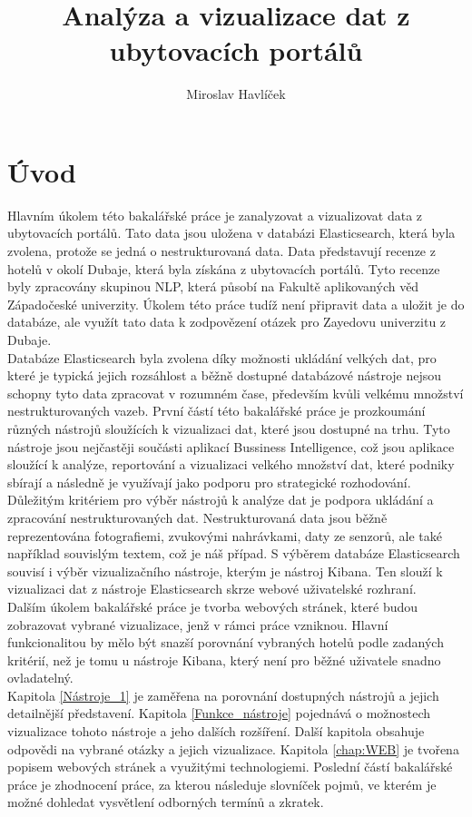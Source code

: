 \documentclass[czech,BP]{thesiskiv}
\author{Miroslav Havlíček}
\title{Analýza a vizualizace dat z ubytovacích portálů}
\begin{document}
%
\maketitle
\tableofcontents
\chapter{Úvod}
Hlavním úkolem této bakalářské práce je zanalyzovat a vizualizovat data z ubytovacích portálů. Tato data jsou uložena v databázi Elasticsearch, která byla zvolena, protože se jedná o nestrukturovaná data. Data představují recenze z hotelů v okolí Dubaje, která byla získána z ubytovacích portálů. Tyto recenze byly zpracovány skupinou NLP, která působí na Fakultě aplikovaných věd Západočeské univerzity. Úkolem této práce tudíž není připravit data a uložit je do databáze, ale využít tato data k zodpovězení otázek pro Zayedovu univerzitu z Dubaje.
\\
Databáze Elasticsearch byla zvolena díky možnosti ukládání velkých dat, pro které je typická jejich rozsáhlost a běžně dostupné databázové nástroje nejsou schopny tyto data zpracovat v rozumném čase, především kvůli velkému množství nestrukturovaných vazeb.\cite{BigData} První částí této bakalářské práce je prozkoumání různých nástrojů sloužících k vizualizaci dat, které jsou dostupné na trhu. Tyto nástroje jsou nejčastěji součásti aplikací Bussiness Intelligence, což jsou aplikace sloužící k analýze, reportování a vizualizaci velkého množství dat, které podniky sbírají a následně je využívají jako podporu pro strategické rozhodování. 
\\Důležitým kritériem pro výběr nástrojů k analýze dat je podpora ukládání a zpracování nestrukturovaných dat. Nestrukturovaná data jsou běžně reprezentována fotografiemi, zvukovými nahrávkami, daty ze senzorů, ale také například  souvislým textem, což je náš případ. S výběrem databáze Elasticsearch souvisí i výběr vizualizačního nástroje, kterým je nástroj Kibana. Ten slouží k vizualizaci dat z nástroje Elasticsearch skrze webové uživatelské rozhraní.
\\
Dalším úkolem bakalářské práce je tvorba webových stránek, které budou zobrazovat vybrané vizualizace, jenž v rámci práce vzniknou. Hlavní funkcionalitou by mělo být snazší porovnání vybraných hotelů podle zadaných kritérií, než je tomu u nástroje Kibana, který není pro běžné uživatele snadno ovladatelný.
\\
Kapitola \ref{Nástroje_1} je zaměřena na porovnání dostupných nástrojů a jejich detailnější představení. Kapitola \ref{Funkce_nástroje} pojednává o možnostech vizualizace tohoto nástroje a jeho dalších rozšíření. Další kapitola obsahuje odpovědi na vybrané otázky a jejich vizualizace. Kapitola \ref{chap:WEB} je tvořena popisem webových stránek a využitými technologiemi. Poslední částí bakalářské práce je zhodnocení práce, za kterou následuje slovníček pojmů, ve kterém je možné dohledat vysvětlení odborných termínů a zkratek.
\end{document}
